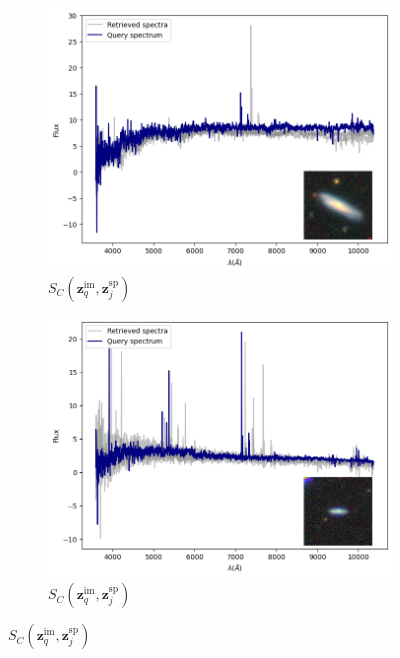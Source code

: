\documentclass[draft, a4paper,12pt]{article}
\begin{document}
\begin{figure}[H]
    \begin{subfigure}[b]{0.45\textwidth}
        \centering
        \includegraphics[width=\textwidth]{../figures/spectral_retrieval_sp_im_1}
        \caption{$S_C(\mathbf{z}_q^{\text{im}}, \mathbf{z}_j^{\text{sp}})$}
        \label{fig:sp_im_1}
    \end{subfigure}%
    \hfill
    \begin{subfigure}[b]{0.45\textwidth}
        \centering
        \includegraphics[width=\textwidth]{../figures/spectral_retrieval_sp_im_2}
        \caption{$S_C(\mathbf{z}_q^{\text{im}}, \mathbf{z}_j^{\text{sp}})$}
        \label{fig:sp_im_2}
    \end{subfigure}


\end{figure}
\end{document}
